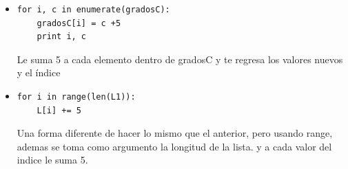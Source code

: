 \documentclass[letterpaper, 12pt,oneside]{article}
\begin{document}
\begin{enumerate}
\begin{itemize}
				
				\item 
				\begin{lstlisting}
for i, c in enumerate(gradosC):
	gradosC[i] = c +5
	print i, c
				\end{lstlisting} Le suma 5 a cada elemento dentro de gradosC y te regresa los valores nuevos y el índice
				\item 
				\begin{lstlisting}
for i in range(len(L1)):
	L[i] += 5
				\end{lstlisting} Una forma diferente de hacer lo mismo que el anterior, pero usando range, ademas se toma como argumento la longitud de la lista. y a cada valor del indice le suma 5.
				
			\end{itemize}
		
		
	
		
	\end{enumerate}
	
	
	
	
	
	
	
	
	
	
	
\end{document}
